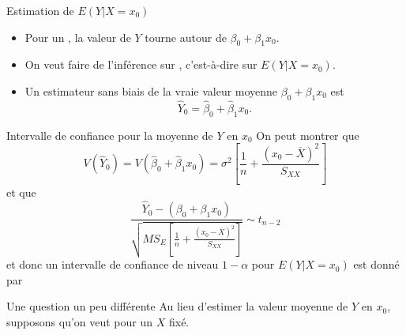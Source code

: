\documentclass{BeamerTemplate}
\begin{document}
\begin{frame}[t]{Estimation de $E(Y|X=x_0)$}

{\small
\begin{itemize}
\item<1-> Pour un  , la valeur de $Y$ tourne autour de $\beta_0+\beta_1x_0$.
\item<2-> On veut faire de l'inférence sur , c'est-à-dire sur $E(Y|X=x_0)$.
\item<3-> Un estimateur sans biais de la vraie valeur moyenne $\beta_0+\beta_1x_0$ est
$$\hat{Y}_0=\hat{\beta}_0+\hat{\beta}_1x_0.$$
\end{itemize}
}
\end{frame}

\begin{frame}[t]{Intervalle de confiance pour la moyenne de $Y$ en $x_0$}
On peut montrer que
$$V(\hat{Y}_0)=V(\hat{\beta}_0+\hat{\beta}_1x_0)=\sigma^2\left[\dfrac1n+\dfrac{(x_0-\overline{X})^2}{S_{XX}}\right]$$
et que
$$
\frac{\hat{Y}_0-(\beta_0+\beta_1x_0)}{\sqrt{MS_E\left[\frac{1}{n}+\frac{(x_0-\overline{X})^2}{S_{XX}}\right]}}\sim t_{n-2}
$$
et donc un intervalle de confiance de niveau $1-\alpha$  pour $E(Y|X=x_0)$ est donné par

{}
\end{frame}


\begin{frame}[t]{Une question un peu différente}
Au lieu d'estimer la valeur moyenne de $Y$ en $x_0$, supposons qu'on veut  pour un $X$ fixé.

\medskip
{}
\end{frame}
\end{document}
